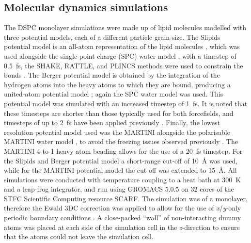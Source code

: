 \documentclass[amsmath,amssymb,twocolumn,superscriptaddress]{revtex4-1}
\begin{document}
\subsection{Molecular dynamics simulations}
The DSPC monolayer simulations were made up of lipid molecules modelled with three potential models, each of a different particle grain-size.
The Slipids potential model is an all-atom representation of the lipid molecules \cite{jambeck_derivation_2012}, which was used alongside the single point charge (SPC) water model \cite{berendsen_missing_1987}, with a timestep of \SI{0.5}{\femto\second}, the SHAKE, RATTLE, and PLINCS methods were used to constrain the  bonds \cite{miyamoto_settle_1992,hess_p-lincs_2008}.
The Berger potential model is obtained by the integration of the hydrogen atoms into the heavy atoms to which they are bound, producing a united-atom potential model \cite{berger_molecular_1997}; again the SPC water model was used.
This potential model was simulated with an increased timestep of \SI{1}{\femto\second}.
It is noted that these timesteps are shorter than those typically used for both forcefields, and timesteps of up to \SI{2}{\femto\second} have been applied previously \cite{berger_molecular_1997,jambeck_derivation_2012}.
Finally, the lowest resolution potential model used was the MARTINI \cite{marrink_martini_2007} alongside the polarisable MARTINI water model \cite{yesylevskyy_polarizable_2010}, to avoid the freezing issues observed previously \cite{koutsioubas_combined_2016}.
The MARTINI 4-to-1 heavy atom beading allows for the use of a \SI{20}{\femto\second} timestep.
For the Slipids and Berger potential model a short-range cut-off of \SI{10}{\angstrom} was used, while for the MARTINI potential model the cut-off was extended to \SI{15}{\angstrom}.
All simulations were conducted with temperature coupling to a heat bath at \SI{300}{\kelvin} and a leap-frog integrator, and run using GROMACS 5.0.5 \cite{berendsen_gromacs_1995,lindahl_gromacs_2001,van_der_spoel_gromacs_2005,hess_gromacs_2008} on 32 cores of the STFC Scientific Computing resource SCARF.
The simulation was of a monolayer, therefore the Ewald 3DC correction was applied to allow for the use of \emph{x}/\emph{y}-only periodic boundary conditions \cite{yeh_ewald_1999}.
A close-packed ``wall'' of non-interacting dummy atoms was placed at each side of the simulation cell in the \emph{z}-direction to ensure that the atoms could not leave the simulation cell.
\end{document}
